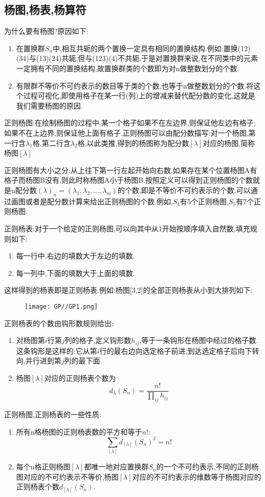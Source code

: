 \documentclass{ctexart}
\begin{document}
\subsection{杨图,杨表,杨算符}

为什么要有杨图?原因如下:
\begin{enumerate}
    \item 在置换群$S_{n}$中,相互共轭的两个置换一定具有相同的置换结构.例如:置换(12)(34)与(13)(24)共轭,但与(123)(4)不共轭.于是对置换群来说,在不同类中的元素一定拥有不同的置换结构,故置换群类的个数即为对n做整数划分的个数.
    \item 有限群不等价不可约表示的数目等于类的个数,也等于n做整数划分的个数.将这个过程可视化,即使用格子在某一行(列)上的增减来替代配分数的变化,这就是我们需要杨图的原因.
\end{enumerate}

\noindent 正则杨图:在绘制杨图的过程中,某一个格子如果不在左边界,则保证他左边有格子;如果不在上边界,则保证他上面有格子.正则杨图可以由配分数描写:对一个杨图,第一行含$\lambda_{1}$格,第二行含$\lambda_{2}$格,以此类推,得到的杨图称为配分数$[\lambda]$对应的杨图,简称杨图$[\lambda]$\medskip

正则杨图有大小之分:从上往下第一行左起开始向右数,如果存在某个位置杨图A有格子而杨图B没有,则此时称杨图A小于杨图B.按照定义可以得到正则杨图的个数就是n配分数$(\lambda)_{n}=(\lambda_{1},\lambda_{2},\ldots,\lambda_{m})$的个数,即是不等价不可约表示的个数.可以通过画图或者是配分数计算来给出正则杨图的个数.例如,$S_{4}$有5个正则杨图,$S_{5}$有7个正则杨图.\medskip

\noindent 正则杨表:对于一个给定的正则杨图,可以向其中从1开始按顺序填入自然数,填充规则如下:
\begin{enumerate}
    \item 每一行中,右边的填数大于左边的填数.
    \item 每一列中,下面的填数大于上面的填数.
\end{enumerate}
这样得到的杨表即是正则杨表.例如:杨图[3,2]的全部正则杨表从小到大排列如下:
\begin{figure}[H]
    \centering
    \texttt{[image: GP//GP1.png]}
\end{figure}
正则杨表的个数由钩形数规则给出:
\begin{enumerate}
    \item 对杨图第$i$行第$j$列的格子,定义钩形数$h_{ij}$,等于一条钩形在杨图中经过的格子数.这条钩形是这样的:它从第$i$行的最右边向选定格子前进,到达选定格子后向下转向,并行进到第$j$列的最下面.
    \item 杨图$[\lambda]$对应的正则杨表个数为\[d_{\lambda}(S_{n})=\frac{n!}{\prod_{ij}h_{ij}}\]
\end{enumerate}
正则杨图,正则杨表的一些性质:
\begin{enumerate}
    \item 所有n格杨图的正则杨表数的平方和等于$n!$:\[\sum_{[\lambda]}d_{[\lambda]}(S_{n})^{2}=n!\]
    \item 每个n格正则杨图$[\lambda]$都唯一地对应置换群$S_{n}$的一个不可约表示,不同的正则杨图对应的不可约表示不等价,杨图$[\lambda]$对应的不可约表示的维数等于杨图对应的正则杨表个数$d_{[\lambda]}(S_{n})$.
\end{enumerate}
\end{document}
